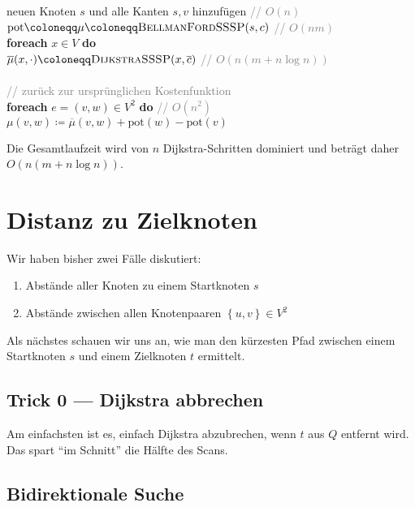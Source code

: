 \begin{pseudocode}
  neuen Knoten \( s \) und alle Kanten \( s,v \) hinzufügen \enskip{} \textcolor{gray}{// \( O(n) \)} \\
  \( \text{pot} \coloneqq \mu \coloneqq \textsc{BellmanFordSSSP}(s,c) \) \enskip{} \textcolor{gray}{// \( O(nm) \)} \\
  \textbf{foreach} \( x \in V \) \textbf{do} \\
  \phantom{\enskip} \( \overline{\mu}(x,\cdot) \coloneqq \textsc{DijkstraSSSP}(x,\overline{c}) \) \enskip{} \textcolor{gray}{// \( O(n(m+n \log n)) \)} \\
  \ \\
  \textcolor{gray}{// zurück zur ursprünglichen Kostenfunktion} \\
  \textbf{foreach} \( e = (v,w) \in V^2 \) \textbf{do} \enskip \textcolor{gray}{// \( O(n^2) \)} \\
  \phantom{\enskip} \( \mu(v,w) \coloneqq \overline{\mu}(v,w) + \text{pot}(w) - \text{pot}(v) \)
\end{pseudocode}


Die Gesamtlaufzeit wird von $n$ Dijkstra-Schritten dominiert und beträgt daher \( O(n(m + n \log n)) \).

\section{Distanz zu Zielknoten}

Wir haben bisher zwei Fälle diskutiert:
\begin{enumerate}
  \item Abstände aller Knoten zu einem Startknoten \( s \)
  \item Abstände zwischen allen Knotenpaaren \( \left \{ u,v \right \} \in V^2 \)
\end{enumerate}

Als nächstes schauen wir uns an, wie man den kürzesten Pfad zwischen einem Startknoten \( s \) und einem Zielknoten \( t \) ermittelt.

\subsection{Trick 0 --- Dijkstra abbrechen}

Am einfachsten ist es, einfach Dijkstra abzubrechen, wenn \( t \) aus \( Q \) entfernt wird. Das spart ``im Schnitt'' die Hälfte des Scans.

\subsection{Bidirektionale Suche}

